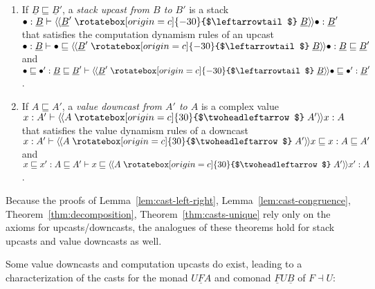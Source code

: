 \documentclass[acmsmall,nonacm]{acmart}
\renewcommand{\u}{\underline}
\newcommand{\ltdyn}{\sqsubseteq}
\newcommand{\uarrow}{\mathrel{\rotatebox[origin=c]{-30}{$\leftarrowtail$}}}
\newcommand{\darrow}{\mathrel{\rotatebox[origin=c]{30}{$\twoheadleftarrow$}}}
\newcommand{\defupcast}[2]{\langle\kern-1ex~\langle{#2}\uarrow{#1}\rangle\kern-1ex~\rangle}
\newcommand{\defdncast}[2]{\langle\kern-1ex~\langle{#1}\darrow{#2}\rangle\kern-1ex~\rangle}
\begin{document}
\begin{definition} \label{def:value-down-computation-up} ~
\begin{enumerate}
\item
  If $\u B \ltdyn \u B'$, a \emph{stack upcast from $B$ to $B'$}
  is a stack $\bullet : \u B \vdash \defupcast{\u B}{\u B'} \bullet : \u
  B'$ that satisfies the computation dynamism rules of an upcast
  ${\bullet : \u B \vdash \bullet \ltdyn \defupcast{\u B}{\u B'} \bullet
    : \u B \ltdyn \u B'}$ and
  ${\bullet \ltdyn \bullet' : \u B \ltdyn \u B' \vdash \defupcast{\u B}{\u B'} \bullet \ltdyn \bullet' : \u B'}$.
    
\item If $A \ltdyn A'$, a \emph{value downcast from $A'$ to $A$} is a
  complex value $x : A' \vdash \defdncast{A}{A'} x : A$ that satisfies
  the value dynamism rules of a downcast
  ${x : A' \vdash \defdncast{A}{A'}{x} \ltdyn x : A \ltdyn A'}$
  and
  ${x \ltdyn x' : A \ltdyn A' \vdash x \ltdyn \defdncast{A}{A'} x' : A}$.
\end{enumerate}
\end{definition}
\begin{longonly}
Because the proofs of Lemma~\ref{lem:cast-left-right},
Lemma~\ref{lem:cast-congruence}, Theorem~\ref{thm:decomposition},
Theorem~\ref{thm:casts-unique} rely only on the axioms for
upcasts/downcasts, the analogues of these theorems hold for stack
upcasts and value downcasts as well.
\end{longonly}
Some value downcasts and computation upcasts do exist, leading to a
characterization of the casts for the monad $U \u F A$ and comonad $\u F
U \u B$ of $F \dashv U$:
\end{document}
